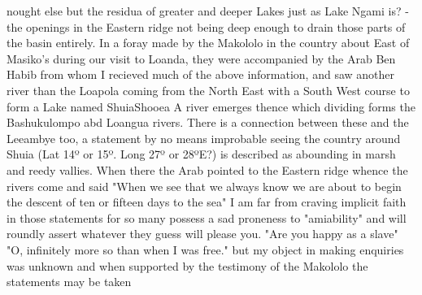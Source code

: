 \documentclass[11pt,twoside]{article}\makeatletter
\begin{document}
nought  \newline else but the residua of greater and deeper  \newline Lakes just as Lake Ngami is? - the openings  \newline in the Eastern ridge not being deep enough  \newline to drain those parts of the basin entirely. \newline  \indent In a foray made by the Makololo  \newline in the country about East of Masiko's  \newline during our visit to Loanda, they were  \newline accompanied by the Arab Ben Habib  \newline from whom I recieved much of the above  \newline information, and saw another river than  \newline the Loapola coming from the North East  \newline with a South West course to form a {\newline \newline \noindent [0009]}  \newline Lake named ShuiaShooea A river  \newline emerges thence which dividing forms the  \newline Bashukulompo abd Loangua rivers. There  \newline is a connection between these and the  \newline Leeambye too, a statement by no means  \newline improbable seeing the country around Shuia  \newline (Lat 14º or 15º. Long 27º or 28ºE?) is described as  \newline abounding in marsh and reedy vallies.  \newline When there the Arab pointed to the Eastern  \newline ridge whence the rivers come and said "When  \newline we see that we always know we are about  \newline to begin the descent of ten or fifteen days  \newline to the sea" \newline  \indent I am far from craving implicit  \newline faith in those statements for so many  \newline possess a sad proneness to "amiability"  \newline and will roundly assert whatever they  \newline guess will please you. "Are you happy  \newline as a slave" "O, infinitely more so than  \newline when I was free." but my object in making  \newline enquiries was unknown and when supported  \newline by the testimony of the Makololo the statements  \newline may be taken 
\end{document}
